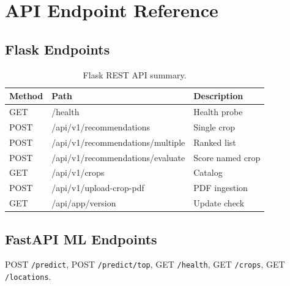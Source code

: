 \chapter{API Endpoint Reference}
\label{app:api}

\section{Flask Endpoints}
\begin{table}[htbp]
\centering
\caption{Flask REST API summary.}
\begin{tabular}{@{}lll@{}}
\toprule
\textbf{Method} & \textbf{Path} & \textbf{Description} \\
\midrule
GET & /health & Health probe \\
POST & /api/v1/recommendations & Single crop \\
POST & /api/v1/recommendations/multiple & Ranked list \\
POST & /api/v1/recommendations/evaluate & Score named crop \\
GET & /api/v1/crops & Catalog \\
POST & /api/v1/upload-crop-pdf & PDF ingestion \\
GET & /api/app/version & Update check \\
\bottomrule
\end{tabular}
\end{table}

\section{FastAPI ML Endpoints}
POST \texttt{/predict}, POST \texttt{/predict/top}, GET \texttt{/health}, GET \texttt{/crops}, GET \texttt{/locations}.
